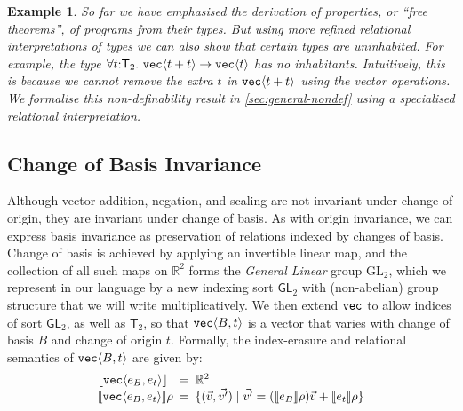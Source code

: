 \documentclass{sigplanconf}
\newcommand{\GL}[1]{\mathrm{GL}_#1}
\newcommand{\SynGL}[1]{\mathsf{GL}_#1}
\newcommand{\SynTransl}[1]{\mathsf{T}_#1}
\newcommand{\sepbar}{\mathrel|}
\newcommand{\tyPrim}[2]{\textup{\texttt{#1}}\langle #2 \rangle}
\newcommand{\tyPrimNm}[1]{\textup{\texttt{#1}}}
\newcommand{\tySem}[1]{\left\lfloor #1 \right\rfloor}
\newcommand{\rsem}[1]{\llbracket #1 \rrbracket}
\newcommand{\sem}[1]{\llbracket #1 \rrbracket}
\theoremstyle{examplestyle}
\newtheorem{example}{Example}
\theoremstyle{restatementstyle}
\begin{document}
\begin{example}\label{ex:uninhabited-type}
  So far we have emphasised the derivation of properties, or ``free
  theorems'', of programs from their types. But using more refined
  relational interpretations of types we can also show that certain
  types are uninhabited. For example, the type $\forall t \mathord:
  \SynTransl{2}.\ \tyPrim{vec}{t + t} \to \tyPrim{vec}{t}$ has no
  inhabitants. Intuitively, this is because we cannot remove the extra
  $t$ in $\tyPrim{vec}{t+t}$ using the vector operations. We formalise
  this non-definability result in \autoref{sec:general-nondef} using a
  specialised relational interpretation.
\end{example}

\subsection{Change of Basis Invariance}
\label{sec:motivation-generalising}

Although vector addition, negation, and scaling are not invariant
under change of origin, they are invariant under change of basis. As
with origin invariance, we can express basis invariance as
preservation of relations indexed by changes of basis. Change of basis
is achieved by applying an invertible linear map, and the collection
of all such maps on $\mathbb{R}^2$ forms the \emph{General Linear}
group $\GL{2}$, which we represent in our language by a new indexing
sort $\SynGL{2}$ with (non-abelian) group structure that we will write
multiplicatively. We then extend $\tyPrimNm{vec}$ to allow indices of
sort $\SynGL{2}$, as well as $\SynTransl{2}$, so that
$\tyPrim{vec}{B,t}$ is a vector that varies with change of basis $B$
and change of origin $t$. Formally, the index-erasure and relational
semantics of $\tyPrim{vec}{B,t}$ are given by:
\begin{displaymath}
  \begin{array}{l@{\hspace{0.5em}=\hspace{0.5em}}l}
    \tySem{\tyPrim{vec}{e_B,e_t}} & \mathbb{R}^2
    \\ \rsem{\tyPrim{vec}{e_B,e_t}}{}\rho & \{ (\vec{v},\vec{v'})
    \sepbar \vec{v'} = (\sem{e_B}\rho)\vec{v} + \sem{e_t}\rho \}
  \end{array}
\end{displaymath}
\end{document}
